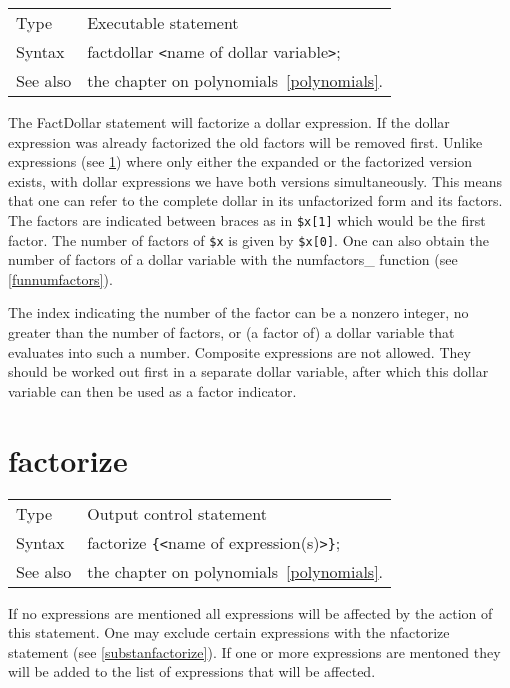 \noindent \begin{tabular}{ll}
Type & Executable statement\\
Syntax & factdollar {\tt<}name of dollar variable{\tt>};
\\ See also & the chapter on polynomials~\ref{polynomials}.
\end{tabular} \vspace{4mm}

\noindent The FactDollar statement will factorize a dollar expression. If 
the dollar expression was already factorized the old factors will be 
removed first. Unlike expressions (see \ref{substafactorize}) where only 
either the expanded or the factorized version exists, with dollar 
expressions we have both versions simultaneously. This means that one can 
refer to the complete dollar in its unfactorized form and its factors. The 
factors are indicated between braces as in \verb:$x[1]: which would be the 
first factor. The number of factors of \verb:$x: is given by \verb:$x[0]:. 
One can also obtain the number of factors of a dollar variable with the 
numfactors\_ function (see \ref{funnumfactors}).

\noindent The index indicating the number of the factor can be a nonzero 
integer, no greater than the number of factors, or (a factor of) a dollar 
variable that evaluates into such a number. Composite expressions are not 
allowed. They should be worked out first in a separate dollar variable, 
after which this dollar variable can then be used as a factor indicator.
\vspace{10mm}


\section{factorize}
\label{substafactorize}

\noindent \begin{tabular}{ll}
Type & Output control statement\\
Syntax & factorize \verb:{:{\tt<}name of expression(s){\tt>}\verb:}:;
\\ See also & the chapter on polynomials~\ref{polynomials}.
\end{tabular} \vspace{4mm}

\noindent If no expressions are mentioned all expressions will be affected 
by the action of this statement. One may exclude certain expressions with 
the nfactorize statement (see \ref{substanfactorize}). If one or more 
expressions are mentoned they will be added to the list of expressions that 
will be affected.

